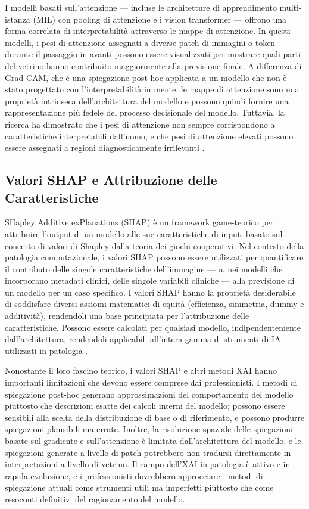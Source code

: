 I modelli basati sull'attenzione — incluse le architetture di apprendimento multi-istanza (MIL) con pooling di attenzione e i vision transformer — offrono una forma correlata di interpretabilità attraverso le mappe di attenzione. In questi modelli, i pesi di attenzione assegnati a diverse patch di immagini o token durante il passaggio in avanti possono essere visualizzati per mostrare quali parti del vetrino hanno contribuito maggiormente alla previsione finale. A differenza di Grad-CAM, che è una spiegazione post-hoc applicata a un modello che non è stato progettato con l'interpretabilità in mente, le mappe di attenzione sono una proprietà intrinseca dell'architettura del modello e possono quindi fornire una rappresentazione più fedele del processo decisionale del modello. Tuttavia, la ricerca ha dimostrato che i pesi di attenzione non sempre corrispondono a caratteristiche interpretabili dall'uomo, e che pesi di attenzione elevati possono essere assegnati a regioni diagnosticamente irrilevanti \cite{bankhead2022}.

\subsection{Valori SHAP e Attribuzione delle Caratteristiche}

SHapley Additive exPlanations (SHAP) è un framework game-teorico per attribuire l'output di un modello alle sue caratteristiche di input, basato sul concetto di valori di Shapley dalla teoria dei giochi cooperativi. Nel contesto della patologia computazionale, i valori SHAP possono essere utilizzati per quantificare il contributo delle singole caratteristiche dell'immagine — o, nei modelli che incorporano metadati clinici, delle singole variabili cliniche — alla previsione di un modello per un caso specifico. I valori SHAP hanno la proprietà desiderabile di soddisfare diversi assiomi matematici di equità (efficienza, simmetria, dummy e additività), rendendoli una base principiata per l'attribuzione delle caratteristiche. Possono essere calcolati per qualsiasi modello, indipendentemente dall'architettura, rendendoli applicabili all'intera gamma di strumenti di IA utilizzati in patologia \cite{amann2020}.

Nonostante il loro fascino teorico, i valori SHAP e altri metodi XAI hanno importanti limitazioni che devono essere comprese dai professionisti. I metodi di spiegazione post-hoc generano approssimazioni del comportamento del modello piuttosto che descrizioni esatte dei calcoli interni del modello; possono essere sensibili alla scelta della distribuzione di base o di riferimento, e possono produrre spiegazioni plausibili ma errate. Inoltre, la risoluzione spaziale delle spiegazioni basate sul gradiente e sull'attenzione è limitata dall'architettura del modello, e le spiegazioni generate a livello di patch potrebbero non tradursi direttamente in interpretazioni a livello di vetrino. Il campo dell'XAI in patologia è attivo e in rapida evoluzione, e i professionisti dovrebbero approcciare i metodi di spiegazione attuali come strumenti utili ma imperfetti piuttosto che come resoconti definitivi del ragionamento del modello.

